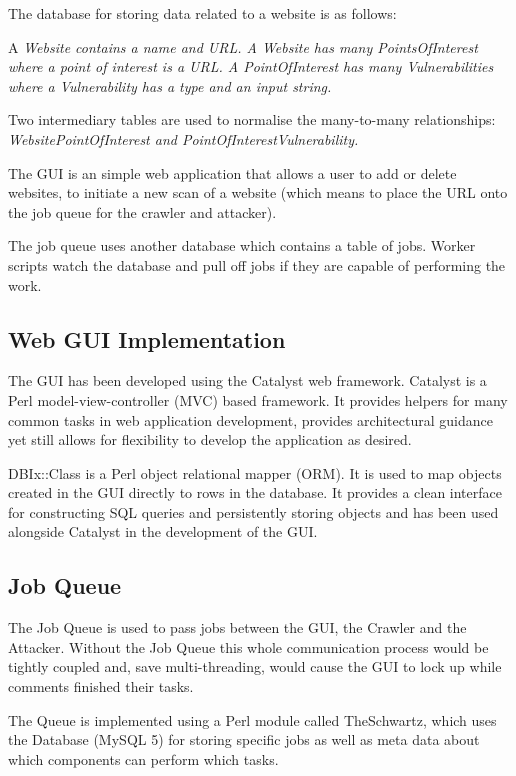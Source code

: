 \documentclass[12pt,a4paper]{article}
\begin{document}
The database for storing data related to a website is as follows:

A \em{Website} contains a name and URL.
A \em{Website} has many \em{PointsOfInterest} where a point of interest is a URL.
A \em{PointOfInterest} has many \em{Vulnerabilities} where a \em{Vulnerability} has a type and an input string.

Two intermediary tables are used to normalise the many-to-many relationships: \em{WebsitePointOfInterest} and \em{PointOfInterestVulnerability}.

The GUI is an simple web application that allows a user to add or delete websites, to initiate a new scan of a website (which means to place the URL onto the job queue for the crawler and attacker).

The job queue uses another database which contains a table of jobs.  Worker scripts watch the database and pull off jobs if they are capable of performing the work.

\subsection{Web GUI Implementation}
The GUI has been developed using the Catalyst web framework.  Catalyst is a Perl model-view-controller (MVC) based framework.  It provides helpers for many common tasks in web application development, provides architectural guidance yet still allows for flexibility to develop the application as desired.

DBIx::Class is a Perl object relational mapper (ORM).  It is used to map objects created in the GUI directly to rows in the database.  It provides a clean interface for constructing SQL queries and persistently storing objects and has been used alongside Catalyst in the development of the GUI.

\subsection{Job Queue}
The Job Queue is used to pass jobs between the GUI, the Crawler and the Attacker.  Without the Job Queue this whole communication process would be tightly coupled and, save multi-threading, would cause the GUI to lock up while comments finished their tasks.

The Queue is implemented using a Perl module called TheSchwartz, which uses the Database (MySQL 5) for storing specific jobs as well as meta data about which components can perform which tasks.
\end{document}

